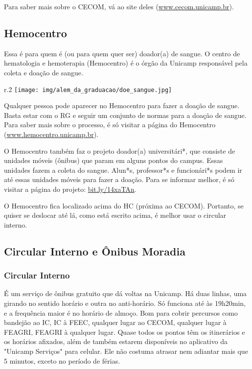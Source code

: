 Para saber mais sobre o CECOM, vá ao site deles (\url{www.cecom.unicamp.br}).

\subsection{Hemocentro}

Essa é para quem é (ou para quem quer ser) doador(a) de sangue. O centro de
hematologia e hemoterapia (Hemocentro) é o órgão da Unicamp responsável pela
coleta e doação de sangue.
\begin{wrapfigure}{r}{.2\textwidth}
    \centering
    \texttt{[image: img/alem\_da\_graduacao/doe\_sangue.jpg]}
\end{wrapfigure}
Qualquer pessoa pode aparecer no Hemocentro para fazer a doação de sangue. Basta
estar com o RG e seguir um conjunto de normas para a doação de sangue. Para
saber mais sobre o processo, é só visitar a página do Hemocentro
(\url{www.hemocentro.unicamp.br}).

O Hemocentro também faz o projeto doador(a) universitári*, que consiste de unidades
móveis (ônibus) que param em alguns pontos do campus. Essas unidades fazem a
coleta do sangue. Alun*s, professor*s e funcionári*s podem ir até essas unidades
móveis para fazer a doação. Para se informar melhor, é só visitar a página do
projeto: \url{bit.ly/14xaTAn}.

O Hemocentro fica localizado acima do HC (próxima ao CECOM). Portanto, se quiser
se deslocar até lá, como está escrito acima, é melhor usar o circular interno.

\subsection{Circular Interno e Ônibus Moradia}

\subsubsection{Circular Interno}
É um serviço de ônibus gratuito que dá voltas na Unicamp. Há duas linhas, uma
girando no sentido horário e outra no anti-horário.  Só funciona até às
19h20min, e a frequência maior é no horário de almoço. Bom para cobrir percursos
como bandejão ao IC, IC à FEEC, qualquer lugar ao CECOM, qualquer lugar à
FEAGRI, FEAGRI à qualquer lugar. Quase todos os pontos têm os itinerários e os
horários afixados, além de também estarem disponíveis no aplicativo da "Unicamp
Serviços" para celular. Ele não costuma atrasar nem adiantar mais que 5 minutos,
exceto no período de férias.

